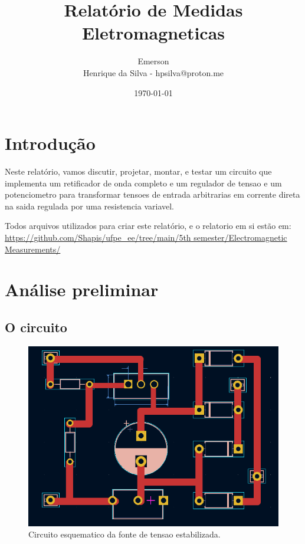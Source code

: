 \documentclass[12pt,twoside, a4paper, twocolumn]{article}
\title{Relatório de Medidas Eletromagneticas}
\author{Emerson \\ Henrique da Silva - hpsilva@proton.me}
\date{\today}
\begin{document}
\maketitle
{}
\newpage
\tableofcontents
\newpage

\section{Introdução}

Neste relatório, vamos discutir, projetar, montar, e testar um circuito que implementa um retificador de onda completo e um regulador de tensao e um potenciometro para transformar tensoes de entrada arbitrarias em corrente direta na saida regulada por uma resistencia variavel.

Todos arquivos utilizados para criar este relatório, e o relatorio em si estão em:  \url{https://github.com/Shapis/ufpe_ee/tree/main/5th semester/Electromagnetic Measurements/}

\section{Análise preliminar}

\subsection{O circuito}

\begin{figure}[h]
    \centering
    \includegraphics[width=1\columnwidth]{images/circuito.png}
    \caption{Circuito esquematico da fonte de tensao estabilizada.}
\end{figure}
\end{document}
